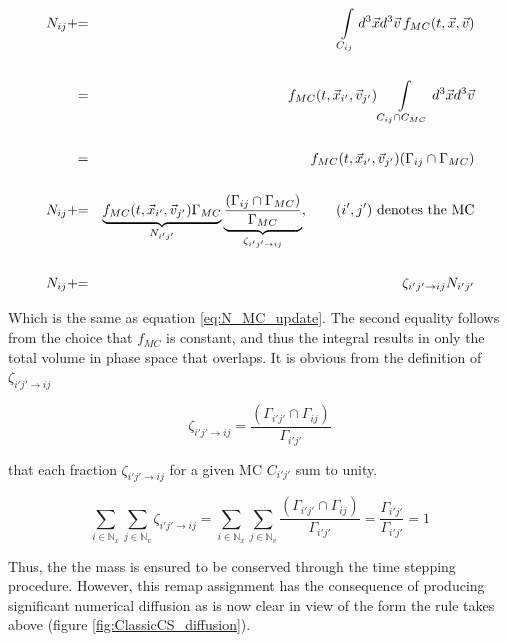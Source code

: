 \documentclass[11pt,titlepage]{report}
\begin{document}
\begin{eqnarray*}
N_{ij} & +\hspace{-.3em}= & \int\limits_{C_{ij}} d^3\vec{x} d^3\vec{v}\, f_{MC}(t,\vec{x},\vec{v})\\
&&\\
& \phantom{+\hspace{-.3em}}= &  f_{MC}(t,\vec{x}_{i'},\vec{v}_{j'}) \int\limits_{C_{ij}\cap C_{MC}} d^3\vec{x} d^3\vec{v} \\
&&\\
& \phantom{+\hspace{-.3em}}= &  f_{MC}(t,\vec{x}_{i'},\vec{v}_{j'}) (\Gamma_{ij}\cap\Gamma_{MC}) \\
&&\\
N_{ij}& +\hspace{-.3em}= &  \underbrace{f_{MC}(t,\vec{x}_{i'},\vec{v}_{j'}) \Gamma_{MC}}_{N_{i'j'}} \underbrace{\frac{(\Gamma_{ij}\cap\Gamma_{MC})}{\Gamma_{MC}}}_{\zeta_{i'j'\to ij}} ,\qquad (i',j') \textrm{ denotes the MC}\\
&&\\
N_{ij} & +\hspace{-.3em}= & \zeta_{i'j'\to ij}N_{i'j'}
\end{eqnarray*}

\noindent Which is the same as equation \eqref{eq:N_MC_update}. The second equality follows from the choice that $f_{MC}$ is constant, and thus the integral results in only the total volume in phase space that overlaps. It is obvious from the definition of $\zeta_{i'j'\to ij}$

$$\zeta_{i'j'\to ij} = \frac{(\Gamma_{i'j'}\cap\Gamma_{ij})}{\Gamma_{i'j'}}$$

\noindent that each fraction $\zeta_{i'j'\to ij}$ for a given MC $C_{i'j'}$ sum to unity.

$$\sum_{i\in\mathbb{N}_x} \sum_{j\in\mathbb{N}_v} \zeta_{i'j'\to ij} = \sum_{i\in\mathbb{N}_x}\sum_{j\in\mathbb{N}_v} \frac{(\Gamma_{i'j'}\cap\Gamma_{ij})}{\Gamma_{i'j'}} = \frac{\Gamma_{i'j'}}{\Gamma_{i'j'}} = 1$$

Thus, the the mass is ensured to be conserved through the time stepping procedure. However, this remap assignment has the consequence of producing significant numerical diffusion as is now clear in view of the form the rule takes above (figure \ref{fig:ClassicCS_diffusion}).
\end{document}
